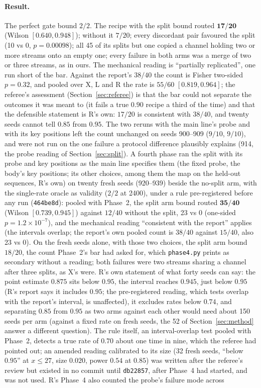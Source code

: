 \documentclass[11pt]{article}
\begin{document}
\paragraph{Result.} The perfect gate bound $2/2$. The recipe with the split bound routed $\mathbf{17/20}$ (Wilson $[0.640, 0.948]$); without it $7/20$; every discordant pair favoured the split (10 vs 0, $p = 0.00098$); all 45 of its splits but one copied a channel holding two or more streams onto an empty one; every failure in both arms was a merge of two or three streams, as in ours. The mechanical reading is ``partially replicated'', one run short of the bar. Against the report's $38/40$ the count is Fisher two-sided $p = 0.32$, and pooled over X, L and R the rate is $55/60$ $[0.819, 0.964]$; the referee's assessment (Section~\ref{sec:referee}) is that the bar could not separate the outcomes it was meant to (it fails a true $0.90$ recipe a third of the time) and that the defensible statement is R's own: $17/20$ is consistent with $38/40$, and twenty seeds cannot tell $0.85$ from $0.95$. The two reruns with the main line's probe and with its key positions left the count unchanged on seeds 900--909 ($9/10$, $9/10$), and were not run on the one failure a protocol difference plausibly explains (914, the probe reading of Section~\ref{sec:split}). A fourth phase ran the split with its probe and key positions as the main line specifies them (the fixed probe, the body's key positions; its other choices, among them the map on the held-out sequences, R's own) on twenty fresh seeds (920--939) beside the no-split arm, with the single-rate oracle as validity ($2/2$ at 2400), under a rule pre-registered before any run (\texttt{464be8d}): pooled with Phase~2, the split arm bound routed $\mathbf{35/40}$ (Wilson $[0.739, 0.945]$) against $12/40$ without the split, 23 vs 0 (one-sided $p = 1.2\times10^{-7}$), and the mechanical reading ``consistent with the report'' applies (the intervals overlap; the report's own pooled count is $38/40$ against $15/40$, also 23 vs 0). On the fresh seeds alone, with those two choices, the split arm bound $18/20$, the count Phase~2's bar had asked for, which \texttt{phase4.py} prints as secondary without a reading; both failures were two streams sharing a channel after three splits, as X's were. R's own statement of what forty seeds can say: the point estimate $0.875$ sits below $0.95$, the interval reaches $0.945$, just below $0.95$ (R's report says it includes $0.95$; the pre-registered reading, which tests overlap with the report's interval, is unaffected), it excludes rates below $0.74$, and separating $0.85$ from $0.95$ as two arms against each other would need about 150 seeds per arm (against a fixed rate on fresh seeds, the 52 of Section~\ref{sec:method} answer a different question). The rule itself, an interval-overlap test pooled with Phase~2, detects a true rate of $0.70$ about one time in nine, which the referee had pointed out; an amended reading calibrated to its size (32 fresh seeds, ``below $0.95$'' at $x \leq 27$, size $0.020$, power $0.54$ at $0.85$) was written after the referee's review but existed in no commit until \texttt{db22857}, after Phase~4 had started, and was not used. R's Phase~4 also counted the probe's failure mode across 
\end{document}
